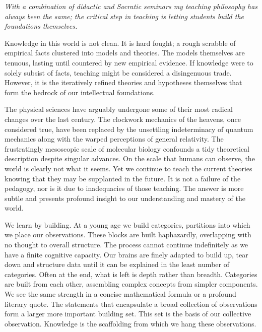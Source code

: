 \documentclass[]{scrartcl}
\begin{document}
\begin{cleanCV}

\hspace{-2cm}
\begin{minipage}{14 cm}
\drawcvheadertitle{2cm}
\setlength\parindent{2ex}
\setlength{\marginparwidth}{3.5cm}

\vspace{1em}

\textit{With a combination of didactic and Socratic seminars my teaching philosophy has always been the same; 
the critical step in teaching is letting students build the foundations themselves.}
\vspace{1em}

Knowledge in this world is not clean.
It is hard fought; a rough scrabble of empirical facts clustered into models and theories. 
The models themselves are tenuous, lasting until countered by new empirical evidence.
If knowledge were to solely subsist of facts, teaching might be considered a disingenuous trade.
However, it is the iteratively refined theories and hypotheses themselves that form the bedrock of our intellectual foundations.

The physical sciences have arguably undergone some of their most radical changes over the last century.
The clockwork mechanics of the heavens, once considered true, have been replaced by the unsettling indeterminacy of quantum mechanics along with the warped perceptions of general relativity. 
The frustratingly mesoscopic scale of molecular biology confounds a tidy theoretical description despite singular advances.
On the scale that humans can observe, the world is clearly not what it seems. 
Yet we continue to teach the current theories knowing that they may be supplanted in the future.
It is not a failure of the pedagogy, nor is it due to inadequacies of those teaching. 
The answer is more subtle and presents profound insight to our understanding and mastery of the world.

We learn by building. 
At a young age we build categories, partitions into which we place our observations.
These blocks are built haphazardly, overlapping with no thought to overall structure. 
The process cannot continue indefinitely as we have a finite cognitive capacity. 
Our brains are finely adapted to build up, tear down and structure data until it can be explained in the least number of categories.
 Often at the end, what is left is depth rather than breadth. 
Categories are built from each other, assembling complex concepts from simpler components. 
We see the same strength in a concise mathematical formula or a profound literary quote. 
The statements that encapsulate a broad collection of observations form a larger more important building set. 
This set is the basis of our collective observation.
Knowledge is the scaffolding from which we hang these observations.


\end{minipage}
\end{cleanCV}
\end{document}
